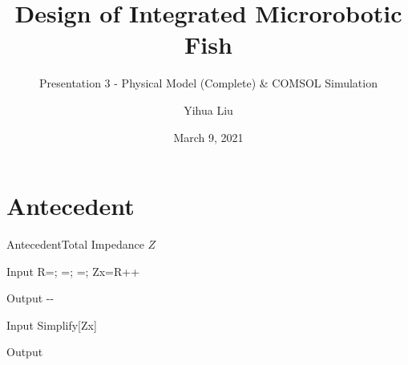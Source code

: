 \documentclass[11pt]{beamer}
\begin{document}
\title{Design of Integrated Microrobotic Fish}
\subtitle{Presentation 3 - Physical Model (Complete) \& COMSOL Simulation}
\author{Yihua Liu}
\date{March 9, 2021}
\begin{frame}
    \titlepage
\end{frame}
\section{Antecedent}
\begin{frame}[fragile]{Antecedent}{Total Impedance $Z$}
        \begin{mmaCell}{Input}
            R=;
            =;
            =;
            Zx=R++
        \end{mmaCell}
        \begin{mmaCell}[addtoindex=3]{Output}
            --
        \end{mmaCell}
        \begin{mmaCell}[addtoindex=5]{Input}
            Simplify[Zx]
        \end{mmaCell}
        \begin{mmaCell}{Output}
        \end{mmaCell}
\end{frame}
\end{document}
